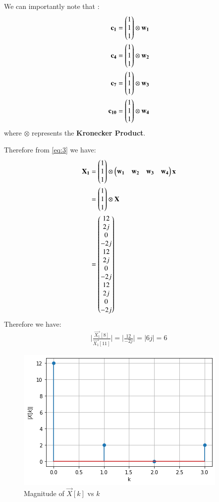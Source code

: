 \documentclass[journal,12pt,twocolumn]{IEEEtran}
\begin{document}
We can importantly note that :
\begin{align}
\mathbf{c_{1}} &= \begin{pmatrix}1 \\ 1 \\ 1\end{pmatrix} \otimes \mathbf{w_{1}}\\
\mathbf{c_{4}} &= \begin{pmatrix}1 \\ 1 \\ 1\end{pmatrix} \otimes \mathbf{w_{2}}\\
\mathbf{c_{7}} &= \begin{pmatrix}1 \\ 1 \\ 1\end{pmatrix} \otimes \mathbf{w_{3}}\\
\mathbf{c_{10}} &= \begin{pmatrix}1 \\ 1 \\ 1\end{pmatrix} \otimes \mathbf{w_{4}}
\end{align}
where $\otimes$ represents the \textbf{Kronecker Product}.

Therefore from \eqref{eq:3} we have:
\begin{align}
\mathbf{X_{1}} &= \begin{pmatrix}1 \\ 1 \\ 1\end{pmatrix} \otimes \begin{pmatrix}\mathbf{w_{1}} & \mathbf{w_{2}} & \mathbf{w_{3}} & \mathbf{w_{4}}\end{pmatrix}\mathbf{x}\\
&= \begin{pmatrix}1 \\ 1 \\ 1\end{pmatrix} \otimes \mathbf{X}\\
&= \begin{pmatrix}12 \\ 2j \\ 0 \\ -2j \\ 12 \\ 2j \\ 0 \\ -2j \\ 12 \\ 2j \\ 0 \\-2j\end{pmatrix}
\end{align}
Therefore we have:
\begin{align}
\Big|{\frac{\vec{X_{1}}[8]}{\vec{X_{1}}[11]}}\Big| = \Big|{\frac{12}{-2j}}\Big| =\big|6j\big| = 6
\end{align}

\begin{figure}[!ht]
    \centering
    \includegraphics[width=\columnwidth] {Gate_Assignment_1_Fig_1.png}
    \caption{Magnitude of $\vec{X}[k]$ vs $k$}
    \label{Magnitude of X[k]}
\end{figure}
\end{document}
